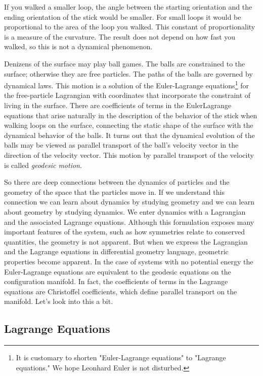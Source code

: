 \documentclass[11pt]{article}
\begin{document}
If you walked a smaller loop, the angle between the starting orientation and the
ending orientation of the stick would be smaller. For small loops it would be
proportional to the area of the loop you walked. This constant of
proportionality is a measure of the curvature. The result does not depend on how
fast you walked, so this is not a dynamical phenomenon.

Denizens of the surface may play ball games. The balls are constrained to the
surface; otherwise they are free particles. The paths of the balls are governed
by dynamical laws. This motion is a solution of the Euler-Lagrange
equations\footnote{It is customary to shorten "Euler-Lagrange equations" to "Lagrange
equations." We hope Leonhard Euler is not disturbed.} for the free-particle Lagrangian with coordinates that
incorporate the constraint of living in the surface. There are coefficients of
terms in the EulerLagrange equations that arise naturally in the description of
the behavior of the stick when walking loops on the surface, connecting the
static shape of the surface with the dynamical behavior of the balls. It turns
out that the dynamical evolution of the balls may be viewed as parallel
transport of the ball's velocity vector in the direction of the velocity vector.
This motion by parallel transport of the velocity is called \emph{geodesic motion}.

So there are deep connections between the dynamics of particles and the geometry
of the space that the particles move in. If we understand this connection we can
learn about dynamics by studying geometry and we can learn about geometry by
studying dynamics. We enter dynamics with a Lagrangian and the associated
Lagrange equations. Although this formulation exposes many important features of
the system, such as how symmetries relate to conserved quantities, the geometry
is not apparent. But when we express the Lagrangian and the Lagrange equations
in differential geometry language, geometric properties become apparent. In the
case of systems with no potential energy the Euler-Lagrange equations are
equivalent to the geodesic equations on the configuration manifold. In fact, the
coefficients of terms in the Lagrange equations are Christoffel coefficients,
which define parallel transport on the manifold. Let's look into this a bit.

\subsection{Lagrange Equations}
\label{sec:org00125e5}
\end{document}
